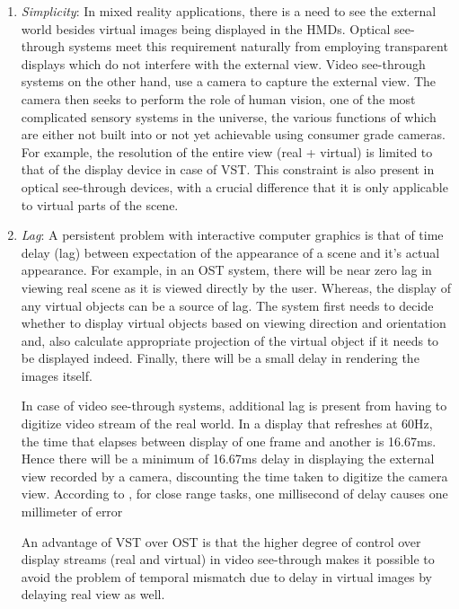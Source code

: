 \begin{enumerate}
\item \textit{Simplicity}: In mixed reality applications, there is a need to see the external world besides virtual images being displayed in the HMDs. Optical see-through systems meet this requirement naturally from employing transparent displays which do not interfere with the external view. Video see-through systems on the other hand, use a camera to capture the external view. The camera then seeks to perform the role of human vision, one of the most complicated sensory systems in the universe, the various functions of which are either not built into or not yet achievable using consumer grade cameras. For example, the resolution of the entire view (real + virtual) is limited to that of the display device in case of VST. This constraint is also present in optical see-through devices, with a crucial difference that it is only applicable to virtual parts of the scene. 

\item \textit{Lag}: A persistent problem with interactive computer graphics is that of time delay (lag) between expectation of the appearance of a scene and it's actual appearance. For example, in an OST system, there will be near zero lag in viewing real scene as it is viewed directly by the user. Whereas, the display of any virtual objects can be a source of lag. The system first needs to decide whether to display virtual objects based on viewing direction and orientation and, also calculate appropriate projection of the virtual object if it needs to be displayed indeed. Finally, there will be a small delay in rendering the images itself. 

In case of video see-through systems, additional lag is present from having to digitize video stream of the real world. In a display that refreshes at 60Hz, the time that elapses between display of one frame and another is 16.67ms. Hence there will be a minimum of 16.67ms delay in displaying the external view recorded by a camera, discounting the time taken to digitize the camera view. According to \parencite{ellis1997factors}, for close range tasks, one millisecond of delay causes one millimeter of error

An advantage of VST over OST is that the higher degree of control over display streams (real and virtual) in video see-through makes it possible to avoid the problem of temporal mismatch due to delay in virtual images by delaying real view as well. 
 
\end{enumerate}

